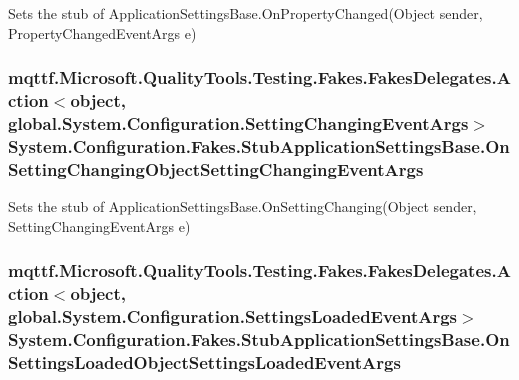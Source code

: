 Sets the stub of Application\-Settings\-Base.\-On\-Property\-Changed(\-Object sender, Property\-Changed\-Event\-Args e)

\hypertarget{class_system_1_1_configuration_1_1_fakes_1_1_stub_application_settings_base_aa750230a6e27eb1f83c296afcaa067a6}{
\subsubsection[{On\-Setting\-Changing\-Object\-Setting\-Changing\-Event\-Args}]{\setlength{\rightskip}{0pt plus 5cm}mqttf.\-Microsoft.\-Quality\-Tools.\-Testing.\-Fakes.\-Fakes\-Delegates.\-Action$<$object, global.\-System.\-Configuration.\-Setting\-Changing\-Event\-Args$>$ System.\-Configuration.\-Fakes.\-Stub\-Application\-Settings\-Base.\-On\-Setting\-Changing\-Object\-Setting\-Changing\-Event\-Args}}\label{class_system_1_1_configuration_1_1_fakes_1_1_stub_application_settings_base_aa750230a6e27eb1f83c296afcaa067a6}


Sets the stub of Application\-Settings\-Base.\-On\-Setting\-Changing(\-Object sender, Setting\-Changing\-Event\-Args e)

\hypertarget{class_system_1_1_configuration_1_1_fakes_1_1_stub_application_settings_base_ad7c9067c28e77f49c9e389a970266f30}{
\subsubsection[{On\-Settings\-Loaded\-Object\-Settings\-Loaded\-Event\-Args}]{\setlength{\rightskip}{0pt plus 5cm}mqttf.\-Microsoft.\-Quality\-Tools.\-Testing.\-Fakes.\-Fakes\-Delegates.\-Action$<$object, global.\-System.\-Configuration.\-Settings\-Loaded\-Event\-Args$>$ System.\-Configuration.\-Fakes.\-Stub\-Application\-Settings\-Base.\-On\-Settings\-Loaded\-Object\-Settings\-Loaded\-Event\-Args}}\label{class_system_1_1_configuration_1_1_fakes_1_1_stub_application_settings_base_ad7c9067c28e77f49c9e389a970266f30}


